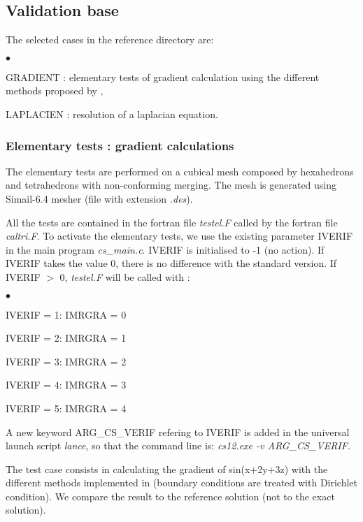 \subsection{Validation base}

The selected cases in the reference directory are:
\begin{list}{$\bullet$}{}
\item GRADIENT : elementary tests of gradient calculation using the
      different methods proposed by \CS,
\item LAPLACIEN : resolution of a laplacian equation.
\end{list}

\subsubsection{Elementary tests : gradient calculations}
The elementary tests are performed on a cubical mesh composed by
hexahedrons and tetrahedrons with non-conforming merging. The mesh is
generated using Simail-6.4 mesher (file with extension {\it .des}).

All the tests are contained in the fortran file {\it testel.F} called by
the fortran file {\it caltri.F}. To activate the elementary tests,
we use the existing parameter IVERIF in the main program {\it
cs\_main.c}. IVERIF is initialised to -1 (no action). If IVERIF takes
the value 0, there is no difference with the standard version. If
IVERIF $>$ 0, {\it testel.F} will be called with :
\begin{list}{$\bullet$}{}
\item IVERIF = 1: IMRGRA = 0
\item IVERIF = 2: IMRGRA = 1
\item IVERIF = 3: IMRGRA = 2
\item IVERIF = 4: IMRGRA = 3
\item IVERIF = 5: IMRGRA = 4
\end{list}

A new keyword ARG\_CS\_VERIF refering to IVERIF is added in the
universal launch script {\it lance}, so that the command line is:
{\it cs12.exe -v ARG\_CS\_VERIF}.

The test case consists in calculating the gradient of sin(x+2y+3z)
with the different methods implemented in \CS (boundary conditions
are treated with Dirichlet condition). We compare the result to the
reference solution (not to the exact solution).


